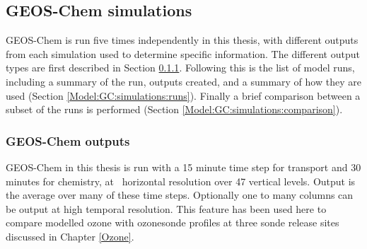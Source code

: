 
  
  \subsection{GEOS-Chem simulations}
    \label{Model:GC:simulations}
    
    GEOS-Chem is run five times independently in this thesis, with different outputs from each simulation used to determine specific information. 
    The different output types are first described in Section \ref{Model:GC:simulations:outputs}.
    Following this is the list of model runs, including a summary of the run, outputs created, and a summary of how they are used (Section \ref{Model:GC:simulations:runs}).
    Finally a brief comparison between a subset of the runs is performed (Section \ref{Model:GC:simulations:comparison}).


    \subsubsection{GEOS-Chem outputs}
      \label{Model:GC:simulations:outputs}
      
      GEOS-Chem in this thesis is run with a 15 minute time step for transport and 30 minutes for chemistry, at \lowhr ~horizontal resolution over 47 vertical levels.
      Output is the average over many of these time steps.
      Optionally one to many columns can be output at high temporal resolution.
      This feature has been used here to compare modelled ozone with ozonesonde profiles at three sonde release sites discussed in Chapter \ref{Ozone}.
      
